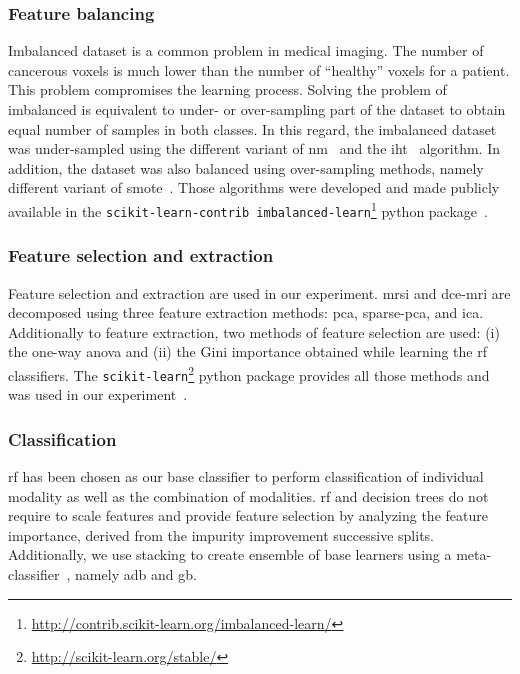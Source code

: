 \documentclass[conference]{sty/ieeeconf}
\begin{document}
\subsubsection{Feature balancing}\label{subsec:chp6:method:fea-bal}
Imbalanced dataset is a common problem in medical imaging.
The number of cancerous voxels is much lower than the number of
``healthy'' voxels for a patient.
This problem compromises the learning process.
Solving the problem of imbalanced is equivalent to under- or
over-sampling part of the dataset to obtain equal number of samples
in both classes.
In this regard, the imbalanced dataset was under-sampled using the different
variant of \ac{nm}~\cite{mani2003knn} and the \ac{iht}~\cite{smith2014instance}
algorithm.
In addition, the dataset was also balanced using over-sampling methods, namely
different variant of \ac{smote}~\cite{chawla2002smote,han2005borderline}.
Those algorithms were developed and made publicly available in the
\texttt{scikit-learn-contrib
  imbalanced-learn}\footnote{\url{http://contrib.scikit-learn.org/imbalanced-learn/}}
python package~\cite{imblearn}.

\subsubsection{Feature selection and extraction}\label{subsec:chp6:method:fea-sel}

Feature selection and extraction are used in our experiment.
\ac{mrsi} and \ac{dce}-\ac{mri} are decomposed using three feature
extraction methods: \ac{pca}, sparse-\ac{pca}, and \ac{ica}.
Additionally to feature extraction, two methods of feature selection
are used: (i) the one-way \ac{anova} and (ii) the Gini importance
obtained while learning the \ac{rf} classifiers.
The \texttt{scikit-learn}\footnote{\url{http://scikit-learn.org/stable/}}
python package provides all those methods and was used in our
experiment~\cite{pedregosa2011scikit}.

\subsubsection{Classification}\label{subsec:chp6:method:clas}

\ac{rf} has been chosen as our base classifier to perform classification of
individual modality as well as the combination of modalities.
\ac{rf} and decision trees do not require to scale features and
provide feature selection by analyzing the feature importance, derived
from the impurity improvement successive splits.
Additionally, we use stacking to create ensemble of base learners using a
meta-classifier~\cite{wolpert1992stacked}, namely \ac{adb} and \ac{gb}.
\end{document}
